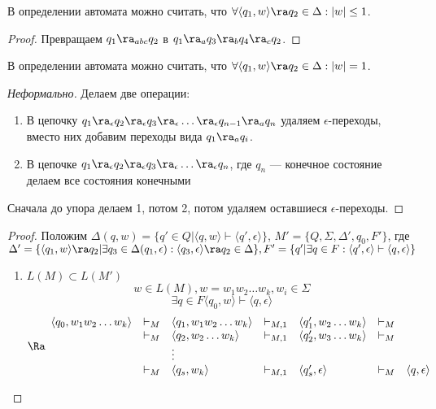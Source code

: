 \begin{proposition}
    В определении автомата можно считать, что \(\forall \langle q_1, w \rangle \ra q_2 \in \Delta: |w| \le 1\).
\end{proposition}
\begin{proof}
    Превращаем \(q_1 \ra_{abc} q_2\) в \(q_1 \ra_a q_3 \ra_b q_4 \ra_c q_2\).
\end{proof}

\begin{theorem}
    В определении автомата можно считать, что \(\forall \langle q_1, w \rangle \ra q_2 \in \Delta: |w| = 1\).
\end{theorem}
\begin{proof}[Неформально]
    Делаем две операции:
    \begin{enumerate}
        \item В цепочку \(q_1 \ra_\epsilon q_2 \ra_\epsilon q_3 \ra_\epsilon \dots \ra_\epsilon q_{n - 1} \ra_a q_n\) удаляем \(\epsilon\)-переходы, вместо них добавим переходы вида \(q_1 \ra_a q_i\).
        
        \item В цепочке \(q_1 \ra_\epsilon q_2 \ra_\epsilon q_3 \ra_\epsilon \dots \ra_\epsilon  q_n\), где \(q_n\) --- конечное состояние делаем все состояния конечными
    \end{enumerate}
    Сначала до упора делаем 1, потом 2, потом удаляем оставшиеся \(\epsilon\)-переходы.
\end{proof}
\begin{proof}
    Положим \(\Delta(q, w) = \{q' \in Q | \langle q, w\rangle \vdash \langle q', \epsilon\rangle\}\), \(M' = \{Q, \Sigma, \Delta', q_0, F'\}\), где \(\Delta' = \{\langle q_1, w\rangle \ra q_2 | \exists q_3 \in \Delta(q_1, \epsilon): \langle q_3, \epsilon\rangle \ra q_2 \in \Delta\}, F' = \{q' | \exists q \in F: \langle q', \epsilon\rangle \vdash \langle q, \epsilon\rangle\}\)

    \begin{enumerate}
        \item \(L(M) \subset L(M')\)
        \[w \in L(M), w = w_1w_2\dots w_k, w_i \in \Sigma\]
        \[\exists q \in F \langle q_0, w\rangle \vdash \langle q, \epsilon\rangle\]
        \[\Ra \begin{array}{lclclcl}
            \langle q_0, w_1w_2\dots w_k\rangle & \vdash_{M} & \langle q_1, w_1w_2\dots w_k\rangle & \vdash_{M, 1} & \langle q_1', w_2\dots w_k\rangle & \vdash_M \\
            
            & \vdash_{M} & \langle q_2, w_2\dots w_k\rangle & \vdash_{M, 1} & \langle q_2', w_3\dots w_k\rangle & \vdash_M \\
            
            & & \vdots & & & \\

            & \vdash_{M} & \langle q_s, w_k\rangle & \vdash_{M, 1} & \langle q_s', \epsilon\rangle & \vdash_M  &\langle q, \epsilon\rangle\\
        \end{array}\]
    \end{enumerate}
\end{proof}
